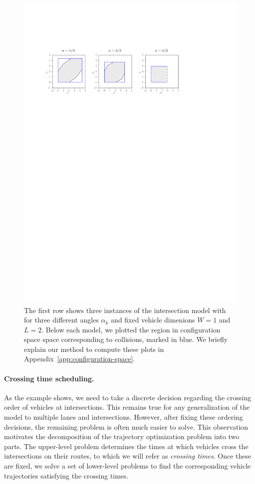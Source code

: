 \documentclass[a4paper]{report}
\theoremstyle{definition}
\theoremstyle{plain}
\begin{document}
\begin{figure}
  \centering
  \includegraphics[scale=1]{figures/intersection-config-spaces}
  \caption{The first row shows three instances of the intersection model with
    for three different angles $\alpha_{k}$ and fixed vehicle dimenions $W=1$
    and $L=2$. Below each model, we plotted the region in configuration space
    space corresponding to collisions, marked in blue. We briefly explain our
    method to compute these plots in Appendix~\ref{app:configuration-space}.}%
  \label{fig:intersection-config-spaces}
\end{figure}


\paragraph{Crossing time scheduling.} As the example shows, we need to take a
discrete decision regarding the crossing order of vehicles at intersections.
This remains true for any generalization of the model to multiple lanes and
intersections.
%
However, after fixing these ordering decisions, the remaining problem is often
much easier to solve. This observation motivates the decomposition of the
trajectory optimization problem into two parts.
%
The upper-level problem determines the times at which vehicles cross the
intersections on their routes, to which we will refer as \emph{crossing times}.
%
Once these are fixed, we solve a set of lower-level problems to find the
corresponding vehicle trajectories satisfying the crossing times.
\end{document}
